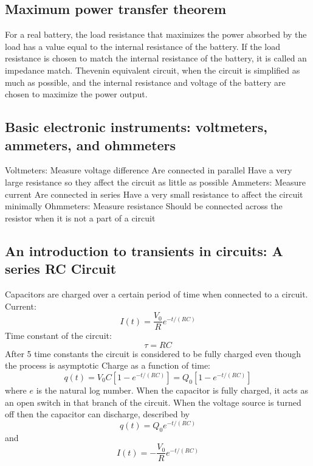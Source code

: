 \documentclass[twocolumn]{article}
\begin{document}
\subsection{Maximum power transfer theorem}
\begin{outline}
	\1 For a real battery, the load resistance that maximizes the power absorbed by the load has a value equal to the internal resistance of the battery. 
	\1 If the load resistance is chosen to match the internal resistance of the battery, it is called an impedance match. 
	\1 Thevenin equivalent circuit, when the circuit is simplified as much as possible, and the internal resistance and voltage of the battery are chosen to maximize the power output. 
\end{outline}
\subsection{Basic electronic instruments: voltmeters, ammeters, and ohmmeters}
\begin{outline}
	\1 Voltmeters:
		\2 Measure voltage difference 
		\2 Are connected in parallel
		\2 Have a very large resistance so they affect the circuit as little as possible
	\1 Ammeters:
		\2 Measure current
		\2 Are connected in series
		\2 Have a very small resistance to affect the circuit minimally
	\2 Ohmmeters: 
		\2 Measure resistance 
		\2 Should be connected across the resistor when it is not a part of a circuit 

\end{outline}
\subsection{An introduction to transients in circuits: A series RC Circuit}
\begin{outline}
	\1 Capacitors are charged over a certain period of time when connected to a circuit. 
	\1 Current: \[I(t)=\dfrac{V_0}{R}e^{-t/(RC)}\]
	\1 Time constant of the circuit: \[\tau=RC\]
	\1 After 5 time constants the circuit is considered to be fully charged even though the process is asymptotic
	\1 Charge as a function of time: \[q(t)=V_0C\left[1-e^{-t/(RC)}\right]=Q_0\left[1-e^{-t/(RC)}\right]\] where $e$ is the natural log number. 
	\1 When the capacitor is fully charged, it acts as an open switch in that branch of the circuit. When the voltage source is turned off then the capacitor can discharge, described by \[q(t)=Q_0e^{-t/(RC)}\] and \[I(t)=-\dfrac{V_0}{R}e^{-t/(RC)}\]
\end{outline}
\end{document}

